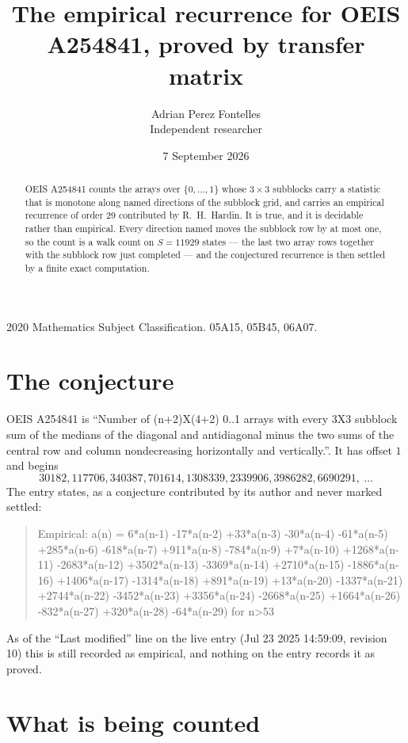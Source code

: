 \documentclass[11pt,a4paper]{article}
\title{The empirical recurrence for OEIS A254841, proved by transfer matrix}
\author{Adrian Perez Fontelles\\ \small Independent researcher}
\date{7 September 2026}
\theoremstyle{plain}
\theoremstyle{definition}
\begin{document}
\maketitle

\begin{abstract}
OEIS A254841 counts the arrays over $\{0,\dots,1\}$ whose $3\times3$ subblocks carry a
statistic that is monotone along named directions of the subblock grid, and carries an
empirical recurrence of order $29$ contributed by R.~H.~Hardin. It is true, and it is
decidable rather than empirical. Every direction named moves the subblock row by at most one,
so the count is a walk count on $S=11929$ states --- the last two array rows together with the
subblock row just completed --- and the conjectured recurrence is then settled by a finite
exact computation.
\end{abstract}

\noindent\small 2020 Mathematics Subject Classification. 05A15, 05B45, 06A07.\normalsize

\section{The conjecture}

OEIS A254841 is ``Number of (n+2)X(4+2) 0..1 arrays with every 3X3 subblock sum of the medians of the diagonal and antidiagonal minus the two sums of the central row and column nondecreasing horizontally and vertically.''. It has offset $1$ and begins
\[
30182, 117706, 340387, 701614, 1308339, 2339906, 3986282, 6690291,\ \dots
\]
The entry states, as a conjecture contributed by its author and never marked settled:
\begin{quote}
Empirical: a(n) = 6*a(n-1) -17*a(n-2) +33*a(n-3) -30*a(n-4) -61*a(n-5) +285*a(n-6) -618*a(n-7) +911*a(n-8) -784*a(n-9) +7*a(n-10) +1268*a(n-11) -2683*a(n-12) +3502*a(n-13) -3369*a(n-14) +2710*a(n-15) -1886*a(n-16) +1406*a(n-17) -1314*a(n-18) +891*a(n-19) +13*a(n-20) -1337*a(n-21) +2744*a(n-22) -3452*a(n-23) +3356*a(n-24) -2668*a(n-25) +1664*a(n-26) -832*a(n-27) +320*a(n-28) -64*a(n-29) for n>53
\end{quote}
As of the ``Last modified'' line on the live entry (Jul 23 2025 14:59:09, revision 10) this is still
recorded as empirical, and nothing on the entry records it as proved.

\section{What is being counted}
\end{document}
